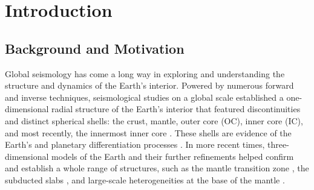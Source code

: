 \chapter{Introduction}\label{ch:intro}

\section{Background and Motivation}\label{sec:intro_background}


Global seismology has come a long way in exploring and understanding the structure and dynamics of the Earth's interior. Powered by numerous forward and inverse techniques, seismological studies on a global scale established a one-dimensional radial structure of the Earth's interior that featured discontinuities and distinct spherical shells: the crust, mantle, outer core (OC), inner core (IC), and most recently, the innermost inner core \citep{dziewonski_preliminary_1981,kennett_constraints_1995,ishii_innermost_2002}. These shells are evidence of the Earth's and planetary differentiation processes \citep{carlson_mechanisms_1994,walter_early_2004}.  In more recent times, three-dimensional models of the Earth \citep{dziewonski_mapping_1984,van_der_hilst_evidence_1997} and their further refinements helped confirm and establish a whole range of structures, such as the mantle transition zone \citep{ritsema_global_2004}, the subducted slabs \citep{widiyantoro_structure_1996}, and large-scale heterogeneities at the base of the mantle \citep{garnero_structure_2008}.



